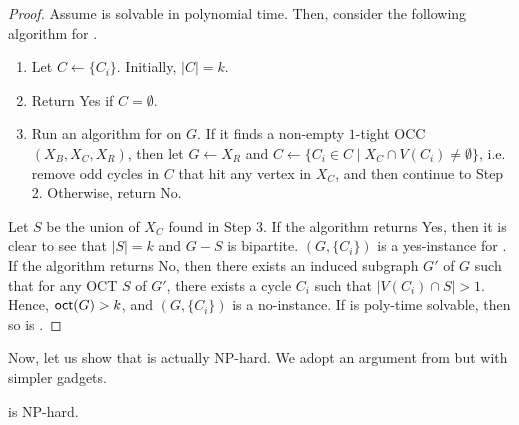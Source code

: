 \begin{proof}
  Assume  is solvable in polynomial time.
  Then, consider the following algorithm for .

  \begin{enumerate}
    \item Let $C \gets \{C_i\}$. Initially, $|C|=k$.
    \item Return \textsf{Yes} if $C=\emptyset$.
    \item Run an algorithm for  on $G$.
    If it finds a non-empty $1$-tight OCC $(X_B,X_C,X_R)$, then
    let $G \gets X_R$ and $C \gets \{C_i \in C \mid X_C \cap V(C_i) \neq \emptyset\}$,
    i.e. remove odd cycles in $C$ that hit any vertex in $X_C$,
    and then continue to Step 2.
    Otherwise, return \textsf{No}.
  \end{enumerate}

  Let $S$ be the union of $X_C$ found in Step 3.
  If the algorithm returns \textsf{Yes}, then
  it is clear to see that $|S|=k$ and $G-S$ is bipartite.
  $(G,\{C_i\})$ is a yes-instance for .
%
  If the algorithm returns \textsf{No}, then
  there exists an induced subgraph $G'$ of $G$ such that
  for any OCT $S$ of $G'$, there exists a cycle $C_i$ such that $|V(C_i) \cap S|>1$.
  Hence, $\textnormal{\textsf{oct}}(G)>k$, and $(G,\{C_i\})$ is a no-instance.
%
  If  is poly-time solvable,
  then so is .
\end{proof}

Now, let us show that  is actually NP-hard.
We adopt an argument from \cite[Lemma 16]{DonkersJ19} but with simpler gadgets.

\begin{lemma}\label{lem:lb-oct-reduction}
   is NP-hard.
\end{lemma}

